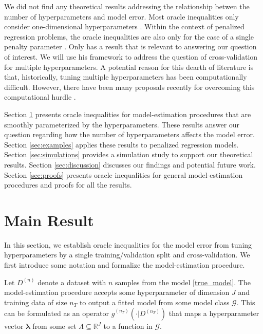 \documentclass[12pt]{article}
\begin{document}
We did not find any theoretical results addressing the relationship betwen the number of hyperparameters and model error. Most oracle inequalities only consider one-dimensional hyperparameters \citep{van2003unified, van2004asymptotic, gyorfi2006distribution}. Within the context of penalized regression problems, the oracle inequalities are also only for the case of a single penalty parameter \citep{golub1979generalized, chetverikov2016cross, chatterjee2015prediction}. Only \citet{lecue2012oracle} has a result that is relevant to answering our question of interest. We will use his framework to address the question of cross-validation for multiple hyperparameters. A potential reason for this dearth of literature is that, historically, tuning multiple hyperparameters has been computationally difficult. However, there have been many proposals recently for overcoming this computational hurdle \citep{bengio2000gradient, foo2008efficient, snoek2012practical}.

Section \ref{sec:main_results} presents oracle inequalities for model-estimation procedures that are smoothly parameterized by the hyperparameters. These results answer our question regarding how the number of hyperparameters affects the model error.
Section \ref{sec:examples} applies these results to penalized regression models.
Section \ref{sec:simulations} provides a simulation study to support our theoretical results.
Section \ref{sec:discussion} discusses our findings and potential future work.
Section \ref{sec:proofs} presents oracle inequalities for general model-estimation procedures and proofs for all the results.


\section{Main Result} \label{sec:main_results}

In this section, we establish oracle inequalities for the model error from tuning hyperparameters by a single training/validation split and cross-validation.
We first introduce some notation and formalize the model-estimation procedure. 

Let $D^{(n)}$ denote a dataset with $n$ samples from the model \eqref{true_model}. The model-estimation procedure accepts some hyperparameter of dimension $J$ and training data of size $n_T$ to output a fitted model from some model class $\mathcal{G}$. This can be formulated as an operator $\hat{g}^{(n_T)}(\cdot | D^{(n_T)})$ that maps a hyperparameter vector $\boldsymbol{\lambda}$ from some set $\Lambda \subseteq \mathbb{R}^J$ to a function in $\mathcal{G}$. 
\end{document}
